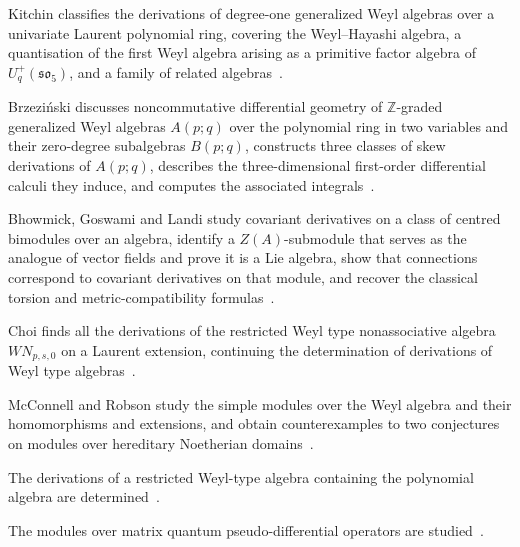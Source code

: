 
Kitchin classifies the derivations of degree-one generalized Weyl algebras over a univariate Laurent polynomial ring, covering the Weyl--Hayashi algebra, a quantisation of the first Weyl algebra arising as a primitive factor algebra of $U_q^+(\mathfrak{so}_5)$, and a family of related algebras~\cite{WlDerivationsOfQuantumAndInvolut2024}.

Brzezi\'nski discusses noncommutative differential geometry of $\mathbb{Z}$-graded generalized Weyl algebras $A(p;q)$ over the polynomial ring in two variables and their zero-degree subalgebras $B(p;q)$, constructs three classes of skew derivations of $A(p;q)$, describes the three-dimensional first-order differential calculi they induce, and computes the associated integrals~\cite{WlNoncommutativeDifferentialGeom2016}.

Bhowmick, Goswami and Landi study covariant derivatives on a class of centred bimodules over an algebra, identify a $Z(A)$-submodule that serves as the analogue of vector fields and prove it is a Lie algebra, show that connections correspond to covariant derivatives on that module, and recover the classical torsion and metric-compatibility formulas~\cite{WlLeviCivitaConnectionsAndVector2020}.

Choi finds all the derivations of the restricted Weyl type nonassociative algebra $WN_{p,s,0}$ on a Laurent extension, continuing the determination of derivations of Weyl type algebras~\cite{WlDerivationsOfARestrictedWeylTy2006}.

McConnell and Robson study the simple modules over the Weyl algebra and their homomorphisms and extensions, and obtain counterexamples to two conjectures on modules over hereditary Noetherian domains~\cite{WlHomomorphismsAndExtensionsOfMo1973}.

The derivations of a restricted Weyl-type algebra containing the polynomial algebra are determined~\cite{WlDerivationsOfARestrictedWeylTy2020}.

The modules over matrix quantum pseudo-differential operators are studied~\cite{WlOnModulesOverMatrixQuantumPseu2020}.
